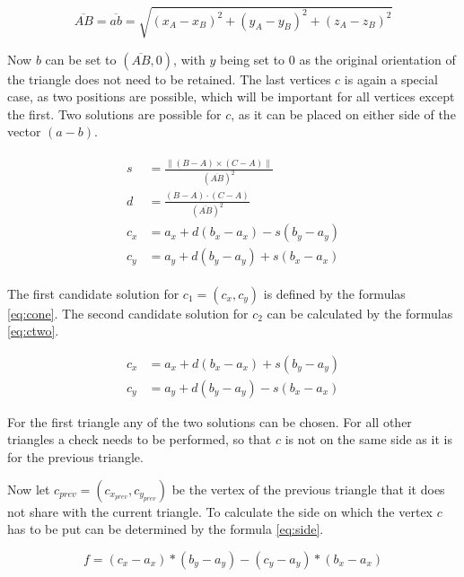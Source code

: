 \documentclass[draft,final]{vutinfth} %
\begin{document}
\begin{equation}
\label{eq:pytha}
\overline{AB} = \overline{ab} = \sqrt{(x_A - x_B)^2 + (y_A - y_B)^2 + (z_A - z_B)^2}
\end{equation}

Now $b$ can be set to $(\overline{AB}, 0)$, with $y$ being set to $0$ as the original orientation of the triangle does not need to be retained. The last vertices $c$ is again a special case, as two positions are possible, which will be important for all vertices except the first. Two solutions are possible for $c$, as it can be placed on either side of the vector $(a-b)$. 

\begin{align}
\label{eq:cone}
\begin{split}
s &= \frac{\|(B - A)\times(C - A)\|}{(\overline{AB})^2}\\
d &= \frac{(B-A)\cdot(C-A)}{(\overline{AB})^2}\\
c_x &= a_x + d(b_x - a_x) - s(b_y - a_y)\\
c_y &= a_y + d(b_y - a_y) + s(b_x - a_x)
\end{split}
\end{align}

The first candidate solution for $c_1 = (c_x, c_y)$ is defined by the formulas \ref{eq:cone}. The second candidate solution for $c_2$ can be calculated by the formulas \ref{eq:ctwo}. 

\begin{equation}
\label{eq:ctwo}
\begin{split}
c_x &= a_x + d(b_x - a_x) + s(b_y - a_y)\\
c_y &= a_y + d(b_y - a_y) - s(b_x - a_x)
\end{split}
\end{equation}

For the first triangle any of the two solutions can be chosen. For all other triangles a check needs to be performed, so that $c$ is not on the same side as it is for the previous triangle.


Now let $c_{prev} = (c_{x_{prev}},c_{y_{prev}})$ be the vertex of the previous triangle that it does not share with the current triangle. To calculate the side on which the vertex $c$ has to be put can be determined by the formula \ref{eq:side}.

\begin{equation}
\label{eq:side}
f = (c_x - a_x) * (b_y - a_y) - (c_y - a_y) * (b_x - a_x)
\end{equation}
\end{document}
